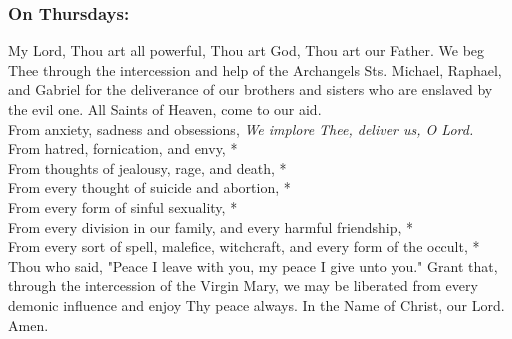 \documentclass{article}
\begin{document}
\begin{multicols}{3}
\begin{FlushLeft}
\subsubsection*{On Thursdays:}
My Lord, Thou art all powerful, Thou art God, Thou art our Father. We beg Thee
through the intercession and help of the Archangels Sts. Michael, Raphael, and
Gabriel for the deliverance of our brothers and sisters who are enslaved by the evil
one. All Saints of Heaven, come to our aid.\\
From anxiety, sadness and obsessions, \textit{We implore Thee, deliver us, O Lord.}\\
From hatred, fornication, and envy, *\\
From thoughts of jealousy, rage, and death, *\\
From every thought of suicide and abortion, *\\
From every form of sinful sexuality, *\\
From every division in our family, and every harmful friendship, *\\
From every sort of spell, malefice, witchcraft, and every form of the occult, *\\
Thou who said, "Peace I leave with you, my peace I give unto you." Grant that,
through the intercession of the Virgin Mary, we may be liberated from every
demonic influence and enjoy Thy peace always. In the Name of Christ, our Lord.
Amen.


\end{FlushLeft}
\end{multicols}
\end{document}
